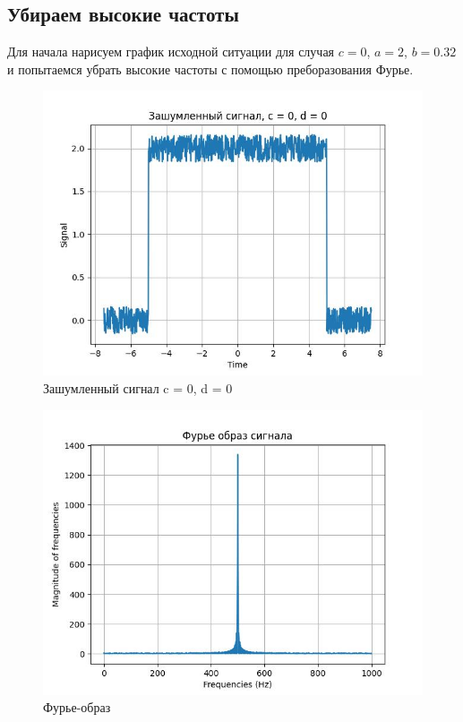   \subsection{Убираем высокие частоты}
  \noindent Для начала нарисуем график исходной ситуации для случая $c = 0$, $a = 2$, $b = 0.32$ и попытаемся убрать высокие частоты с помощью преборазования Фурье.
  \begin{figure}[!h]
    \centering
    \includegraphics[scale=0.78]{../images/result/original_s1.jpeg}
    \caption{Зашумленный сигнал c = 0, d = 0}
  \end{figure}
  \begin{figure}[!h]
    \centering
    \includegraphics[scale=0.78]{../images/result/original_s1_fourier.jpeg}
    \caption{Фурье-образ}
  \end{figure}
